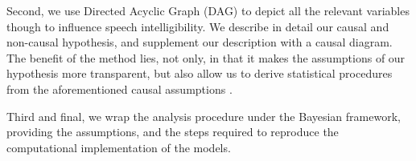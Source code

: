 Second, we use Directed Acyclic Graph (DAG) \cite{Pearl_2009, Cinelli_et_al_2021} to depict all the relevant variables though to influence speech intelligibility. We describe in detail our causal and non-causal hypothesis, and supplement our description with a causal diagram. The benefit of the method lies, not only, in that it makes the assumptions of our hypothesis more transparent, but also allow us to derive statistical procedures from the aforementioned causal assumptions \cite{McElreath_2020, Yarkoni_2020, Rohrer_et_al_2021}.

Third and final, we wrap the analysis procedure under the Bayesian framework, providing the assumptions, and the steps required to reproduce the computational implementation of the models.
%
%
